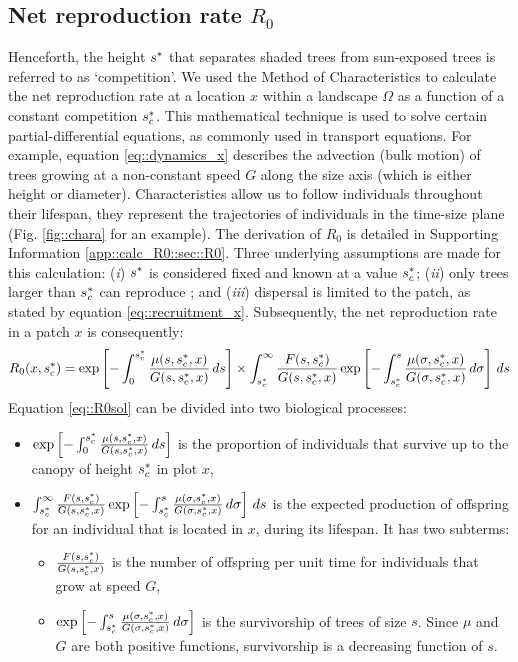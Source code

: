 \subsection{Net reproduction rate $ R_0 $}
Henceforth, the height $ {s}^{*} $ that separates shaded trees from sun-exposed trees is referred to as `competition'. We used the Method of Characteristics \citep{Olver2014b} to calculate the net reproduction rate at a location $ x $ within a landscape $ \Omega $ as a function of a constant competition $ {s}^{*}_c $. This mathematical technique is used to solve certain partial-differential equations, as commonly used in transport equations. For example, equation \eqref{eq::dynamics_x} describes the advection (bulk motion) of trees growing at a non-constant speed $ G $ along the size axis (which is either height or diameter). Characteristics allow us to follow individuals throughout their lifespan, \ie they represent the trajectories of individuals in the time-size plane (Fig. \ref{fig::chara} for an example). The derivation of $ R_0 $ is detailed in Supporting Information \ref{app::calc_R0::sec::R0}. Three underlying assumptions are made for this calculation: (\textit{i}) $ {s}^{*} $ is considered fixed and known at a value $ {s}^{*}_c $; (\textit{ii}) only trees larger than $ {s}^{*}_c $ can reproduce \citep{Strigul2008}; and (\textit{iii}) dispersal is limited to the patch, as stated by equation \eqref{eq::recruitment_x}. Subsequently, the net reproduction rate in a patch $ x $ is consequently:
\begin{equation} \label{eq::R0sol}
	R_0 (x, {s}^{*}_c) = \exp \left[-\int_0^{{s}^{*}_c}\frac{\mu(s, {s}^{*}_c, x)}{G(s, {s}^{*}_c, x)} \, ds \right] \times \int_{{s}^{*}_c}^{\infty} \frac{F(s, {s}^{*}_c)}{G(s, {s}^{*}_c, x)} \exp \left[-\int_{{s}^{*}_c}^{s} \frac{\mu(\sigma, {s}^{*}_c, x)}{G(\sigma, {s}^{*}_c, x)} \, d\sigma \right] \, ds
\end{equation}
Equation \eqref{eq::R0sol} can be divided into two biological processes:
\begin{itemize}
	\item $ \exp\left[-\int_0^{{s}^{*}_c}\frac{\mu(s, {s}^{*}_c, x)}{G(s, {s}^{*}_c, x)} \, ds \right] $ is the proportion of individuals that survive up to the canopy of height $ {s}^{*}_c $ in plot $ x $,
	\item $ \int_{{s}^{*}_c}^{\infty} \frac{F(s, {s}^{*}_c)}{G(s, {s}^{*}_c, x)} \exp \left[-\int_{{s}^{*}_c}^{s} \frac{\mu(\sigma, {s}^{*}_c, x)}{G(\sigma, {s}^{*}_c, x)} \, d\sigma \right] \, ds $ is the expected production of offspring for an individual that is located in $ x $, during its lifespan. It has two subterms:
	\begin{itemize}[label=\tiny$ \blacksquare $]
		\item $ \frac{F(s, {s}^{*}_c)}{G(s, {s}^{*}_c, x)} $ is the number of offspring per unit time for individuals that grow at speed $ G $,
		\item $ \exp \left[-\int_{{s}^{*}_c}^{s} \frac{\mu(\sigma, {s}^{*}_c, x)}{G(\sigma, {s}^{*}_c, x)} \, d\sigma \right] $ is the survivorship of trees of size $ s $. Since $ \mu $ and $ G $ are both positive functions, survivorship is a decreasing function of $ s $.
	\end{itemize}
\end{itemize}


